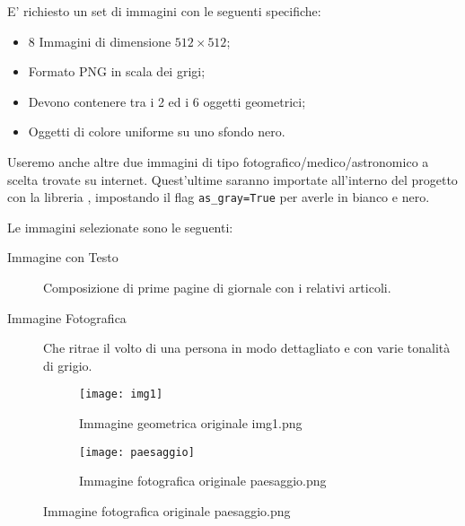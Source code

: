 E' richiesto un set di immagini con le seguenti specifiche: 
\begin{itemize}
    \item 8 Immagini di dimensione $512 \times 512$;
    \item Formato PNG in scala dei grigi;
    \item Devono contenere tra i 2 ed i 6 oggetti geometrici;
    \item Oggetti di colore uniforme su uno sfondo nero.
\end{itemize}


Useremo anche altre due immagini di tipo fotografico/medico/astronomico a scelta trovate su internet.
Quest'ultime saranno importate all'interno del progetto con la libreria , impostando il flag \verb|as_gray=True| per averle in bianco e nero.

Le immagini selezionate sono le seguenti:
\begin{description}
    \item[Immagine con Testo] Composizione di prime pagine di giornale con i relativi articoli.
    \item[Immagine Fotografica] Che ritrae il volto di una persona in modo dettagliato e con varie tonalità di grigio.
\end{description}


\begin{figure}
    \centering
    \begin{subfigure}{0.5\textwidth}
    \texttt{[image: img1]}
    \caption{Immagine geometrica originale img1.png}
    \label{fig:img1}
    \end{subfigure}
    \begin{subfigure}{0.5\textwidth}
    \texttt{[image: paesaggio]}
    \caption{Immagine fotografica originale paesaggio.png}
    \label{fig:paesaggio}
    \end{subfigure}
\end{figure}
    